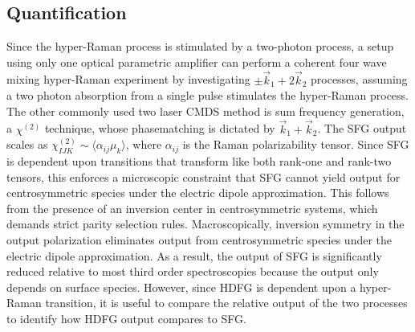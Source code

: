 \documentclass[aip, jcp, reprint, onecolumn]{revtex4-2}
\begin{document}




\subsection{Quantification}

Since the hyper-Raman process is stimulated by a two-photon process, a setup using only one optical parametric amplifier can perform a coherent four wave mixing hyper-Raman experiment by investigating $\pm \vec{k}_1 + 2\vec{k}_2$ processes, assuming a two photon absorption from a single pulse stimulates the hyper-Raman process.
The other commonly used two laser CMDS method is sum frequency generation, a $\chi^{(2)}$ technique, whose phasematching is dictated by $\vec{k}_1 + \vec{k}_2$.
The SFG output scales as $\chi^{(2)}_{IJK} \sim \langle \alpha_{ij} \mu_k \rangle$, where $\alpha_{ij}$ is the Raman polarizability tensor.
Since SFG is dependent upon transitions that transform like both rank-one and rank-two tensors, this enforces a microscopic constraint that SFG cannot yield output for centrosymmetric species under the electric dipole approximation.
This follows from the presence of an inversion center in centrosymmetric systems, which demands strict parity selection rules. \cite{RN230}
Macroscopically, inversion symmetry in the output polarization eliminates output from centrosymmetric species under the electric dipole approximation.\cite{RN227, RN132}
As a result, the output of SFG is significantly reduced relative to most third order spectroscopies because the output only depends on surface species.
However, since HDFG is dependent upon a hyper-Raman transition, it is useful to compare the relative output of the two processes to identify how HDFG output compares to SFG.
\end{document}
